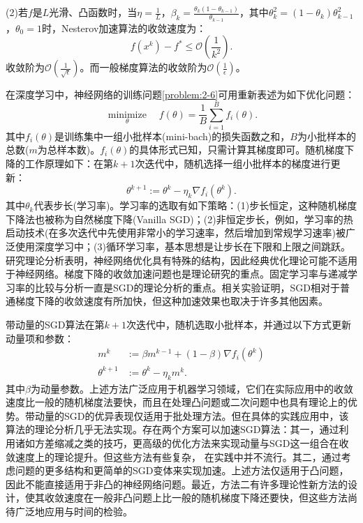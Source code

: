 (2)若$f$是$L$光滑、凸函数时，当$\eta=\frac{1}{L}$，$\beta_k=\frac{\theta_k(1-\theta_{k-1})}{\theta_{k-1}}$，其中$\theta^2_k=(1-\theta_k)\theta_{k-1}^2$，$\theta_0=1$时，Nesterov加速算法的收敛速度为：
\begin{equation}
	f(x^k)-f^*\leq{\mathcal{O}(\frac{1}{k^2})}.
\end{equation}收敛阶为$\mathcal{O}(\frac{1}{\sqrt{\epsilon}})$。而一般梯度算法的收敛阶为$\mathcal{O}(\frac{1}{\epsilon})$。

在深度学习中，神经网络的训练问题\eqref{problem:2-6}可用重新表述为如下优化问题：
\begin{equation} \label{problem:2-7}
	\mathop{minimize}\limits_{\theta}\quad f(\theta)=\frac{1}{B}\sum_{i=1}^{B}f_i(\theta).
\end{equation}
其中$f_i(\theta)$是训练集中一组小批样本(mini-bach)的损失函数之和，$B$为小批样本的总数($m$为总样本数)。$f_i(\theta)$的具体形式已知，只需计算其梯度即可。随机梯度下降的工作原理如下：在第$k+1$次迭代中，随机选择一组小批样本的梯度进行更新：
\begin{equation} \label{method:2-3}
	\theta^{k+1}:=\theta^k-\eta_k\nabla{f_i(\theta^k)}.
\end{equation}
其中$\theta_k$代表步长(学习率)。学习率的选取有如下策略：(1)步长恒定，这种随机梯度下降法也被称为自然梯度下降(Vanilla SGD)；(2)非恒定步长，例如，学习率的热启动技术(在多次迭代中先使用非常小的学习速率，然后增加到常规学习速率)被广泛使用深度学习中；(3)循环学习率，基本思想是让步长在下限和上限之间跳跃。研究理论分析表明，神经网络优化具有特殊的结构，因此经典优化理论可能不适用于神经网络。梯度下降的收敛加速问题也是理论研究的重点。固定学习率与递减学习率的比较与分析一直是SGD的理论分析的重点。相关实验证明，SGD相对于普通梯度下降的收敛速度有所加快，但这种加速效果也取决于许多其他因素。

带动量的SGD算法在第$k+1$次迭代中，随机选取小批样本，并通过以下方式更新动量项和参数：
\begin{equation} \label{method:2-4}
	\begin{aligned}
		m^k&:=\beta{m^{k-1}} + (1-\beta)\nabla{f_i(\theta^k)}\\
		\theta^{k+1}&:=\theta^k-\eta_{k}{m^k}.
	\end{aligned}
\end{equation}
其中$\beta$为动量参数。上述方法广泛应用于机器学习领域，它们在实际应用中的收敛速度比一般的随机梯度法要快，而且在处理凸问题或二次问题中也具有理论上的优势。带动量的SGD的优异表现仅适用于批处理方法。但在具体的实践应用中，该算法的理论分析几乎无法实现。存在两个方案可以加速SGD算法：其一，通过利用诸如方差缩减之类的技巧，更高级的优化方法来实现动量与SGD这一组合在收敛速度上的理论提升。但这些方法有些复杂， 在实践中并不流行。其二，通过考虑问题的更多结构和更简单的SGD变体来实现加速。上述方法仅适用于凸问题，因此不能直接适用于非凸的神经网络问题。最近，方法二有许多理论性新方法的设计，使其收敛速度在一般非凸问题上比一般的随机梯度下降还要快，但这些方法尚待广泛地应用与时间的检验。

